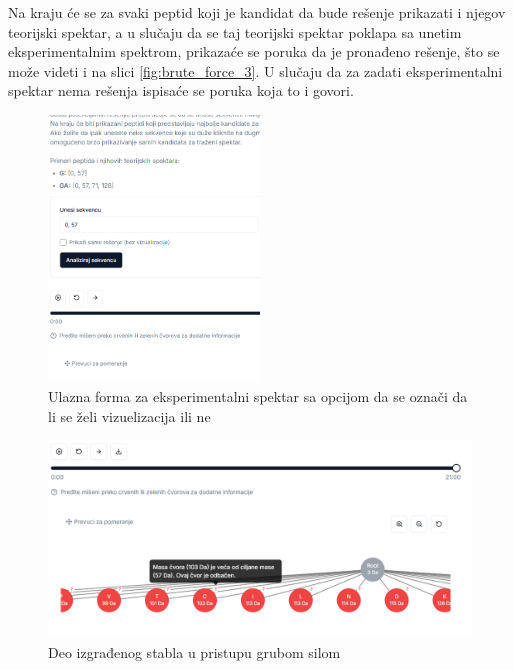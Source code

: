 \documentclass[12pt,oneside]{memoir}
\begin{document}
Na kraju će se za svaki peptid koji je kandidat da bude rešenje prikazati i njegov teorijski spektar, a u slučaju da se taj teorijski spektar poklapa sa unetim eksperimentalnim spektrom, prikazaće se poruka da je pronađeno rešenje, što se može videti i na slici \ref{fig:brute_force_3}. U slučaju da za zadati eksperimentalni spektar nema rešenja ispisaće se poruka koja to i govori.
\clearpage
\begin{figure}[H]
\centering
\includegraphics[width=0.5\textwidth]{images/brute_force_2.png}
\caption{Ulazna forma za eksperimentalni spektar sa opcijom da se označi da li se želi vizuelizacija ili ne}
\label{fig:brute_force_2}
\end{figure}

\begin{figure}[H]
\centering
\includegraphics[width=1\textwidth]{images/brute_force_4.png}
\caption{Deo izgrađenog stabla u pristupu grubom silom}
\label{fig:brute_force_4}
\end{figure}
\end{document}
